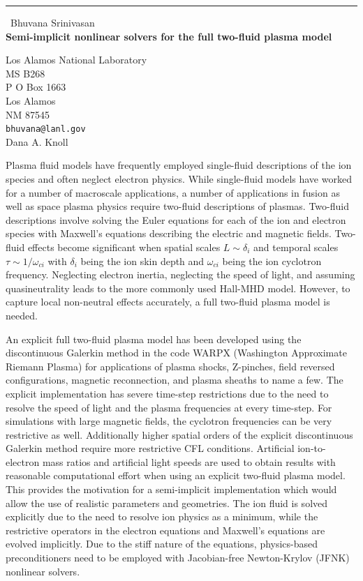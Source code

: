 \documentclass{report}
\begin{document}
\begin{center}
\rule{6in}{1pt} \
{\large Bhuvana Srinivasan \\
{\bf Semi-implicit nonlinear solvers for the full two-fluid plasma model}}

Los Alamos National Laboratory \\ MS B268 \\ P O Box 1663 \\ Los Alamos \\ NM 87545
\\
{\tt bhuvana@lanl.gov}\\
Dana A. Knoll\end{center}

Plasma fluid models have frequently employed single-fluid descriptions
of the ion species and often neglect electron physics. While
single-fluid models have worked for a number of macroscale
applications, a number of applications in fusion as well as space
plasma physics require two-fluid descriptions of plasmas. Two-fluid
descriptions involve solving the Euler equations for each of the ion
and electron species with Maxwell's equations describing the electric
and magnetic fields. Two-fluid effects become significant when spatial
scales $L\sim \delta_i$ and temporal scales $\tau \sim 1/\omega_{ci}$
with $\delta_i$ being the ion skin depth and $\omega_{ci}$ being the
ion cyclotron frequency. Neglecting electron inertia, neglecting the
speed of light, and assuming quasineutrality leads to the more
commonly used Hall-MHD model. However, to capture local non-neutral
effects accurately, a full two-fluid plasma model is needed.

An explicit full two-fluid plasma model has been developed using the
discontinuous Galerkin method in the code WARPX (Washington
Approximate Riemann Plasma) for applications of plasma shocks,
Z-pinches, field reversed configurations, magnetic reconnection, and
plasma sheaths to name a few. The explicit implementation has severe
time-step restrictions due to the need to resolve the speed of light
and the plasma frequencies at every time-step. For simulations with
large magnetic fields, the cyclotron frequencies can be very
restrictive as well. Additionally higher spatial orders of the
explicit discontinuous Galerkin method require more restrictive CFL
conditions. Artificial ion-to-electron mass ratios and artificial
light speeds are used to obtain results with reasonable computational
effort when using an explicit two-fluid plasma model. This provides
the motivation for a semi-implicit implementation which would allow
the use of realistic parameters and geometries. The ion fluid is
solved explicitly due to the need to resolve ion physics as a minimum,
while the restrictive operators in the electron equations and
Maxwell's equations are evolved implicitly. Due to the stiff nature of
the equations, physics-based preconditioners need to be employed with
Jacobian-free Newton-Krylov (JFNK) nonlinear solvers.
\end{document}
